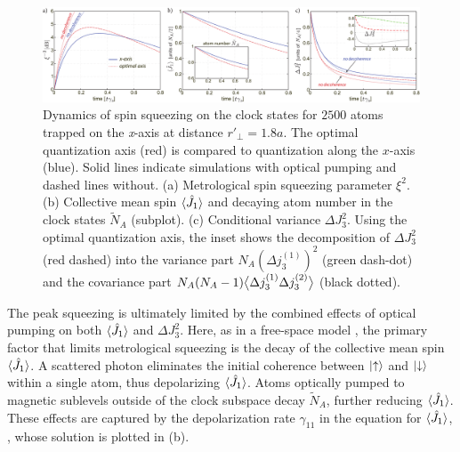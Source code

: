 \documentclass[preprint, aps,pra,onecolumn]{revtex4-1} %
\newcommand{\varz}{\Delta J_3^2}
\newcommand{\jx}{\hat{J}_1}
\newcommand{\NA}{\tilde{N}_A}
\begin{document}
\begin{figure}[t]
\includegraphics[scale=0.42]{./Figs/Fig_SqueezingDynamics}
\caption{Dynamics of spin squeezing on the clock states for $2500$ atoms trapped on the \emph{x}-axis at distance $ r'\!_\perp=1.8a$. 
The optimal quantization axis (red) is compared to quantization along the $x$-axis (blue). 
Solid lines indicate simulations with optical pumping and dashed lines without. 
(a) Metrological spin squeezing parameter $\xi^{2}$. 
(b) Collective mean spin $\langle{\hat{J}_1}\rangle$ and decaying atom number in the clock states $\NA$ (subplot).
(c) Conditional variance $\varz$. 
Using the optimal quantization axis, the inset shows the decomposition of $ \Delta J_3^2 $ (red dashed) into the variance part $N_A (\Delta j_3^{(1)})^2$ (green dash-dot) and the covariance part $N_A(N_A-1)\big\langle \Delta j_3^{(1)}\Delta j_3^{(2)} \big\rangle$ (black dotted).
}\label{Fig::Squeezing_Dynamics}
\end{figure}


The peak squeezing is ultimately limited by the combined effects of optical pumping on both $\expt{\jx}$ and $\varz$.  Here, as in a free-space model \cite{baragiola_three-dimensional_2014}, the primary factor that limits metrological squeezing is the decay of the collective mean spin $\expt{\jx}$. 
A scattered photon eliminates the initial coherence between $\lvert{\uparrow}\rangle$ and $\lvert{\downarrow}\rangle$ within a single atom, thus depolarizing $\expt{\jx}$.  
Atoms optically pumped to magnetic sublevels outside of the clock subspace decay $\NA$, further reducing $\expt{\jx}$. 
These effects are captured by the depolarization rate $\gamma_{11}$ in the equation for $\expt{\jx}$, , whose solution is plotted in (b).
\end{document}

